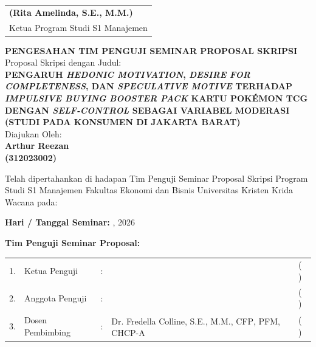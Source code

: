 \documentclass[12pt,a4paper]{article}
\numberwithin{equation}{section}
\numberwithin{table}{section}
\numberwithin{figure}{section}
\newcommand{\namamahasiswa}{Arthur Reezan}
\newcommand{\nim}{312023002}
\newcommand{\dosbim}{Dr. Fredella Colline, S.E., M.M., CFP\textsuperscript{\textregistered}, PFM, CHCP-A}
\newcommand{\ketprodi}{Rita Amelinda, S.E., M.M.}
\newcommand{\judulskripsi}{PENGARUH \emph{HEDONIC MOTIVATION}, \emph{DESIRE FOR COMPLETENESS}, DAN \emph{SPECULATIVE MOTIVE} TERHADAP \emph{IMPULSIVE BUYING} \emph{BOOSTER PACK} KARTU POK\'EMON TCG DENGAN \emph{SELF-CONTROL} SEBAGAI VARIABEL MODERASI (STUDI PADA KONSUMEN DI JAKARTA BARAT)}
\begin{document}
\vspace{0.3cm}
\noindent
\begin{tabular}{l}
  \textbf{(\ketprodi)} \\
  Ketua Program Studi S1 Manajemen
\end{tabular}

\newpage
\thispagestyle{frontmatter}
{}
\begin{center}
  {\large\bfseries PENGESAHAN TIM PENGUJI SEMINAR PROPOSAL SKRIPSI}\\[0.5cm]
  {\normalsize Proposal Skripsi dengan Judul:}\\[0.3cm]
  {\bfseries\judulskripsi}\\[0.5cm]
  {\normalsize Diajukan Oleh:}\\[0.2cm]
  {\large\bfseries \namamahasiswa}\\[0.1cm]
  {\large\bfseries (\nim)}
\end{center}

\vspace{0.4cm}
\noindent
Telah dipertahankan di hadapan Tim Penguji Seminar Proposal Skripsi Program Studi S1 Manajemen Fakultas Ekonomi dan Bisnis Universitas Kristen Krida Wacana pada:

\vspace{0.4cm}
\noindent \textbf{Hari / Tanggal Seminar:} \underline{\hspace{4cm}}, \underline{\hspace{3cm}} 2026

\vspace{0.4cm}
\noindent \textbf{Tim Penguji Seminar Proposal:}

\vspace{0.4cm}
\noindent
\begin{tabular}{@{}p{0.5cm} >{\raggedright\arraybackslash}p{3.2cm} p{0.2cm} >{\raggedright\arraybackslash}p{5.0cm} p{2.8cm}@{}}
  1. & Ketua Penguji    & : & \underline{\hspace{4.4cm}} & ( \underline{\hspace{2.3cm}} ) \\[1.3cm]
  2. & Anggota Penguji  & : & \underline{\hspace{4.4cm}} & ( \underline{\hspace{2.3cm}} ) \\[1.3cm]
  3. & Dosen Pembimbing & : & \dosbim                    & ( \underline{\hspace{2.3cm}} ) \\
\end{tabular}
\end{document}
